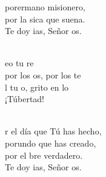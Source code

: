 \begin{cancion}
	porermano misionero, \\
	por la sica que suena.\\
	Te doy ias, Señor os.\\\jump\\
	\begin{chorus}%
	eo tu re\\
	por los os, por los te  \\
	l tu o, grito en lo \\
	¡Túbertad! \\
	\end{chorus}%
	\jump\\
	r el día que Tú has hecho, \\
	porundo que has creado, \\
	por el bre verdadero.\\
	Te doy ias, Señor os.\\
\end{cancion}%
